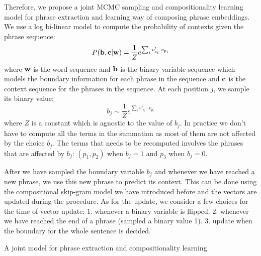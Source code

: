 Therefore, we propose a joint MCMC sampling and compositionality learning model for phrase extraction and learning way of composing phrase embeddings. We use a log bi-linear
model to compute the probability of contexts given the phrase sequence:
\begin{equation}
P({\bf b},{\bf c}|{\bf w})= \frac{1}{Z}e^{\sum_i v'_{c_i} \cdot v_{p_i}}
\end{equation}
where ${\bf w}$ is the word sequence and ${\bf b}$ is the binary variable sequence which models the boundary information for each phrase in the sequence and ${\bf c}$ is the context sequence for the phrases in the sequence.
At each position $j$, we sample its binary value:
$$b_j \sim \frac{1}{Z} e^{\sum_i v'_{c_i} \cdot v_{p_i}}$$
where $Z$ is a constant which is agnostic to the value of $b_j$. In practice we don't have to compute all the terms in the summation as most of them are not affected by the choice $b_j$. The terms that needs to be recomputed
involves the phrases that are affected by $b_j$: $(p_1, p_2)$ when $b_j=1$ and $p_3$ when $b_j=0$. 


After we have sampled the boundary variable $b_j$ and whenever we have reached a new phrase, we use this new phrase to predict its context. This can be done using
the compositional skip-gram model we have introduced before and the vectors are updated during the procedure. As for the update, we consider a few choices for the time
of vector update: 1. whenever a binary variable is flipped. 2. whenever we have reached the end of a phrase (sampled a binary value 1). 3. update when the boundary for the whole sentence is decided.
\begin{algorithm}[t]
\small
\caption{A joint model for phrase extraction and compositionality learning}
\begin{algorithmic}[1]
            \ENDIF
        \ENDFOR
    \ENDFOR
\ENDFOR
\end{algorithmic}
\label{alg:joint}
\end{algorithm}
